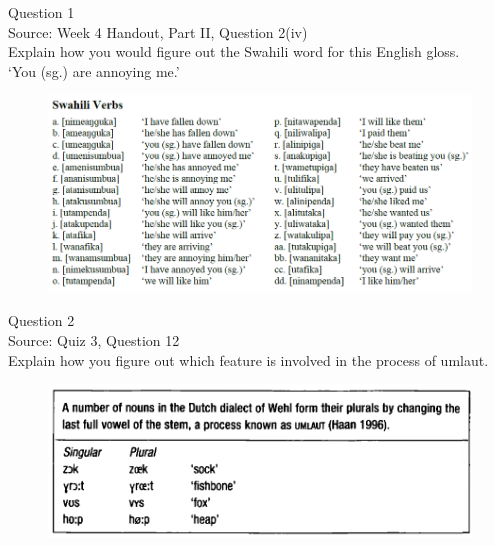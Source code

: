 \documentclass[12pt]{article}
\begin{document}
\begin{center}
\textbf{{\color{blue}{\HUGE START OF EXAM\\}}}

\textbf{{\color{blue}{\HUGE Student ID: 97077\\}}}

\textbf{{\color{blue}{\HUGE 9:50\\}}}

\end{center}
\newpage

{\large Question 1}\\

Source: Week 4 Handout, Part II, Question 2(iv)\\

Explain how you would figure out the Swahili word for this English gloss.\\

‘You (sg.) are annoying me.’

\begin{figure}[H]
\includegraphics{../images/swahiliverbs.png}
\end{figure}

\newpage

{\large Question 2}\\

Source: Quiz 3, Question 12\\

Explain how you figure out which feature is involved in the process of umlaut.\\

\begin{figure}[H]
\includegraphics{../images/dutch.png}
\end{figure}

\newpage

\begin{center}
\textbf{{\color{red}{\HUGE END OF EXAM}}}\\

\end{center}
\newpage
\end{document}
